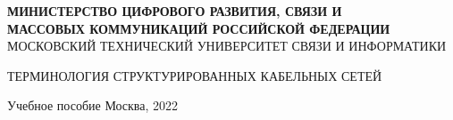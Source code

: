 \newcommand{\signplace}{\underline{\hspace{40mm}}}
\begin{titlepage}
\begin{center}
    \MakeUppercase{{\bf Министерство цифрового развития, связи и \\
    массовых коммуникаций Российской федерации}\\
    Московский Технический Университет Связи И Информатики}\par
    \vfill
    \MakeUppercase{Терминология структурированных кабельных сетей}
    \par\par
    Учебное пособие
    \vfill
    {Москва, 2022}
\end{center}
\end{titlepage}